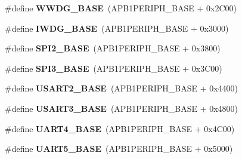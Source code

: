 \begin{DoxyCompactItemize}
\item 
\hypertarget{group___peripheral__memory__map_ga9a5bf4728ab93dea5b569f5b972cbe62}{\#define {\bfseries W\-W\-D\-G\-\_\-\-B\-A\-S\-E}~(A\-P\-B1\-P\-E\-R\-I\-P\-H\-\_\-\-B\-A\-S\-E + 0x2\-C00)}\label{group___peripheral__memory__map_ga9a5bf4728ab93dea5b569f5b972cbe62}

\item 
\hypertarget{group___peripheral__memory__map_ga8543ee4997296af5536b007cd4748f55}{\#define {\bfseries I\-W\-D\-G\-\_\-\-B\-A\-S\-E}~(A\-P\-B1\-P\-E\-R\-I\-P\-H\-\_\-\-B\-A\-S\-E + 0x3000)}\label{group___peripheral__memory__map_ga8543ee4997296af5536b007cd4748f55}

\item 
\hypertarget{group___peripheral__memory__map_gac3e357b4c25106ed375fb1affab6bb86}{\#define {\bfseries S\-P\-I2\-\_\-\-B\-A\-S\-E}~(A\-P\-B1\-P\-E\-R\-I\-P\-H\-\_\-\-B\-A\-S\-E + 0x3800)}\label{group___peripheral__memory__map_gac3e357b4c25106ed375fb1affab6bb86}

\item 
\hypertarget{group___peripheral__memory__map_gae634fe8faa6922690e90fbec2fc86162}{\#define {\bfseries S\-P\-I3\-\_\-\-B\-A\-S\-E}~(A\-P\-B1\-P\-E\-R\-I\-P\-H\-\_\-\-B\-A\-S\-E + 0x3\-C00)}\label{group___peripheral__memory__map_gae634fe8faa6922690e90fbec2fc86162}

\item 
\hypertarget{group___peripheral__memory__map_gade83162a04bca0b15b39018a8e8ec090}{\#define {\bfseries U\-S\-A\-R\-T2\-\_\-\-B\-A\-S\-E}~(A\-P\-B1\-P\-E\-R\-I\-P\-H\-\_\-\-B\-A\-S\-E + 0x4400)}\label{group___peripheral__memory__map_gade83162a04bca0b15b39018a8e8ec090}

\item 
\hypertarget{group___peripheral__memory__map_gabe0d6539ac0026d598274ee7f45b0251}{\#define {\bfseries U\-S\-A\-R\-T3\-\_\-\-B\-A\-S\-E}~(A\-P\-B1\-P\-E\-R\-I\-P\-H\-\_\-\-B\-A\-S\-E + 0x4800)}\label{group___peripheral__memory__map_gabe0d6539ac0026d598274ee7f45b0251}

\item 
\hypertarget{group___peripheral__memory__map_ga94d92270bf587ccdc3a37a5bb5d20467}{\#define {\bfseries U\-A\-R\-T4\-\_\-\-B\-A\-S\-E}~(A\-P\-B1\-P\-E\-R\-I\-P\-H\-\_\-\-B\-A\-S\-E + 0x4\-C00)}\label{group___peripheral__memory__map_ga94d92270bf587ccdc3a37a5bb5d20467}

\item 
\hypertarget{group___peripheral__memory__map_gaa155689c0e206e6994951dc3cf31052a}{\#define {\bfseries U\-A\-R\-T5\-\_\-\-B\-A\-S\-E}~(A\-P\-B1\-P\-E\-R\-I\-P\-H\-\_\-\-B\-A\-S\-E + 0x5000)}\label{group___peripheral__memory__map_gaa155689c0e206e6994951dc3cf31052a}


\end{DoxyCompactItemize}
